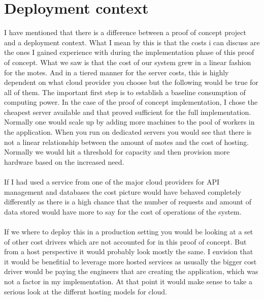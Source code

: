 \documentclass[]{uiophd}
\begin{document}
\section{Deployment context}
I have mentioned that there is a difference between a proof of concept project and a deployment context. What I mean by this is that the costs i can discuss are the ones I gained experience with during the implementation phase of this proof of concept. What we saw is that the cost of our system grew in a linear fashion for the motes. And in a tiered manner for the server costs, this is highly dependent on what cloud provider you choose but the following would be true for all of them. The important first step is to establish a baseline consumption of computing power. In the case of the proof of concept implementation, I chose the cheapest server available and that proved sufficient for the full implementation. Normally one would scale up by adding more machines to the pool of workers in the application. When you run on dedicated servers you would see that there is not a linear relationship between the amount of motes and the cost of hosting. Normally we would hit a threshold for capacity and then provision more hardware based on the increased need.
\\\\
If I had used a service from one of the major cloud providers for API management and databases the cost picture would have behaved completely differently as there is a high chance that the number of requests and amount of data stored would have more to say for the cost of operations of the system.
\\\\
If we where to deploy this in a production setting you would be looking at a set of other cost drivers which are not accounted for in this proof of concept. But from a host perspective it would probably look mostly the same. I envision that it would be benefitial to leverage more hosted services as ususally the bigger cost driver would be paying the engineers that are creating the application, which was not a factor in my implementation. At that point it would make sense to take a serious look at the differnt hosting models for cloud.
\\\\
\end{document}
